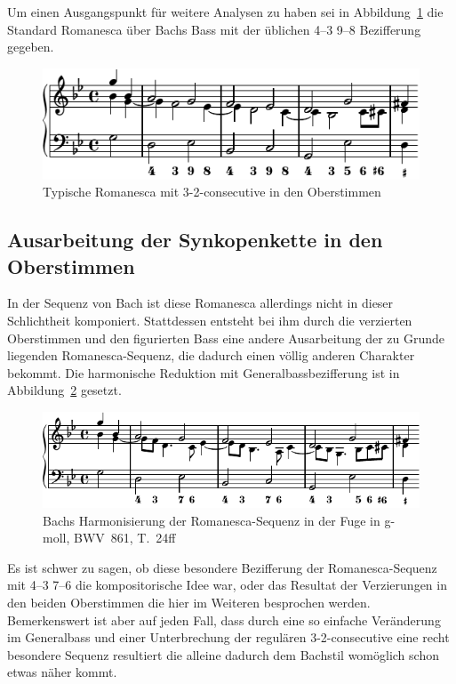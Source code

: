 Um einen Ausgangspunkt für weitere Analysen zu haben sei in Abbildung~\ref{fig:bwv681-romanesca-standard} die Standard Romanesca über Bachs Bass mit der üblichen 4--3 9--8 Bezifferung gegeben.

\begin{figure}[htbp]
	\centering
	\includegraphics{lilypond/g-moll/render/romanesca-standard}
	\caption{Typische Romanesca mit 3-2-consecutive in den Oberstimmen}
	\label{fig:bwv681-romanesca-standard}
\end{figure}


\subsection{Ausarbeitung der Synkopenkette in den Oberstimmen}

In der Sequenz von Bach ist diese Romanesca allerdings nicht in dieser Schlichtheit komponiert.
Stattdessen entsteht bei ihm durch die verzierten Oberstimmen und den figurierten Bass eine andere Ausarbeitung der zu Grunde liegenden Romanesca-Sequenz, die dadurch einen völlig anderen Charakter bekommt.
Die harmonische Reduktion mit Generalbassbezifferung ist in Abbildung~\ref{fig:bwv681-vorhalte} gesetzt.

\begin{figure}[htbp]
	\centering
	\includegraphics{lilypond/g-moll/render/romanesca-vorhalte}
	\caption{Bachs Harmonisierung der Romanesca-Sequenz in der Fuge in g-moll, BWV~861, T.~24ff}
	\label{fig:bwv681-vorhalte}
\end{figure}

Es ist schwer zu sagen, ob diese besondere Bezifferung der Romanesca-Sequenz mit 4--3 7--6 die kompositorische Idee war, oder das Resultat der Verzierungen in den beiden Oberstimmen die hier im Weiteren besprochen werden.
Bemerkenswert ist aber auf jeden Fall, dass durch eine so einfache Veränderung im Generalbass und einer Unterbrechung der regulären 3-2-consecutive eine recht besondere Sequenz resultiert die alleine dadurch dem Bachstil womöglich schon etwas näher kommt.

